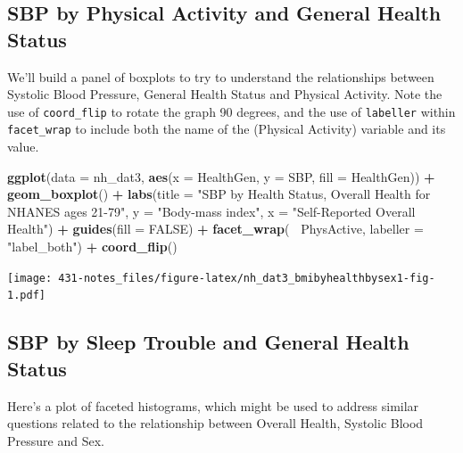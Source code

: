 \documentclass[
]{book}
\newenvironment{Shaded}{\begin{snugshade}}{\end{snugshade}}
\newcommand{\DataTypeTok}[1]{\textcolor[rgb]{0.13,0.29,0.53}{#1}}
\newcommand{\KeywordTok}[1]{\textcolor[rgb]{0.13,0.29,0.53}{\textbf{#1}}}
\newcommand{\NormalTok}[1]{#1}
\newcommand{\OperatorTok}[1]{\textcolor[rgb]{0.81,0.36,0.00}{\textbf{#1}}}
\newcommand{\OtherTok}[1]{\textcolor[rgb]{0.56,0.35,0.01}{#1}}
\newcommand{\StringTok}[1]{\textcolor[rgb]{0.31,0.60,0.02}{#1}}
\begin{document}
\hypertarget{sbp-by-physical-activity-and-general-health-status}{%
\subsection{SBP by Physical Activity and General Health Status}\label{sbp-by-physical-activity-and-general-health-status}}

We'll build a panel of boxplots to try to understand the relationships between Systolic Blood Pressure, General Health Status and Physical Activity. Note the use of \texttt{coord\_flip} to rotate the graph 90 degrees, and the use of \texttt{labeller} within \texttt{facet\_wrap} to include both the name of the (Physical Activity) variable and its value.

\begin{Shaded}
\begin{Highlighting}[]
\KeywordTok{ggplot}\NormalTok{(}\DataTypeTok{data =}\NormalTok{ nh_dat3, }\KeywordTok{aes}\NormalTok{(}\DataTypeTok{x =}\NormalTok{ HealthGen, }\DataTypeTok{y =}\NormalTok{ SBP, }\DataTypeTok{fill =}\NormalTok{ HealthGen)) }\OperatorTok{+}\StringTok{ }
\StringTok{    }\KeywordTok{geom_boxplot}\NormalTok{() }\OperatorTok{+}\StringTok{ }
\StringTok{    }\KeywordTok{labs}\NormalTok{(}\DataTypeTok{title =} \StringTok{"SBP by Health Status, Overall Health for NHANES ages 21-79"}\NormalTok{,}
         \DataTypeTok{y =} \StringTok{"Body-mass index"}\NormalTok{, }\DataTypeTok{x =} \StringTok{"Self-Reported Overall Health"}\NormalTok{) }\OperatorTok{+}\StringTok{ }
\StringTok{    }\KeywordTok{guides}\NormalTok{(}\DataTypeTok{fill =} \OtherTok{FALSE}\NormalTok{) }\OperatorTok{+}
\StringTok{    }\KeywordTok{facet_wrap}\NormalTok{(}\OperatorTok{~}\StringTok{ }\NormalTok{PhysActive, }\DataTypeTok{labeller =} \StringTok{"label_both"}\NormalTok{) }\OperatorTok{+}\StringTok{ }
\StringTok{    }\KeywordTok{coord_flip}\NormalTok{()}
\end{Highlighting}
\end{Shaded}

\texttt{[image: 431-notes\_files/figure-latex/nh\_dat3\_bmibyhealthbysex1-fig-1.pdf]}

\hypertarget{sbp-by-sleep-trouble-and-general-health-status}{%
\subsection{SBP by Sleep Trouble and General Health Status}\label{sbp-by-sleep-trouble-and-general-health-status}}

Here's a plot of faceted histograms, which might be used to address similar questions related to the relationship between Overall Health, Systolic Blood Pressure and Sex.
\end{document}
